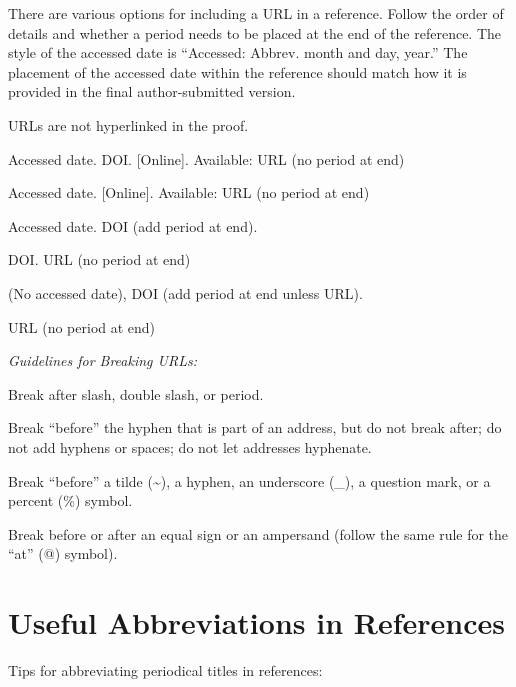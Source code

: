 \documentclass[10pt]{article}
\renewcommand{\thesubsection}{\Alph{subsection}}
\newcommand*{\subsectionlabel}{\thesubsection.}
\newcommand*{\guidelabel}[1]{\par\vspace{-4pt}\hspace*{22pt}\textit{#1}\par\vspace{-\parskip}}
\begin{document}
There are various options for including a URL in a reference. Follow the order of details and whether a period needs to be placed at the end of the reference. The style of the accessed date is “Accessed: Abbrev. month and day, year.” The placement of the accessed date within the reference should match how it is provided in the final author-submitted version.

URLs are not hyperlinked in the proof.

\begin{guideitems}
  \item Accessed date. DOI. [Online]. Available: URL (no period at end)
  \item Accessed date. [Online]. Available: URL (no period at end)
  \item Accessed date. DOI (add period at end).
  \item DOI. URL (no period at end)
  \item (No accessed date), DOI (add period at end unless URL).
  \item URL (no period at end)
\end{guideitems}
\guidelabel{Guidelines for Breaking URLs:}
\begin{guideitems}
  \item Break after slash, double slash, or period.
  \item Break “before” the hyphen that is part of an address, but do not break after; do not add hyphens or spaces; do not let addresses hyphenate.
  \item Break “before” a tilde (\textasciitilde{}), a hyphen, an underscore (\_), a question mark, or a percent (\%) symbol.
  \item Break before or after an equal sign or an ampersand (follow the same rule for the “at” (@) symbol).
\end{guideitems}

\renewcommand*{\subsectionlabel}{\textbf{\thesubsection.}}
\section{Useful Abbreviations in References}

Tips for abbreviating periodical titles in references:
\end{document}
